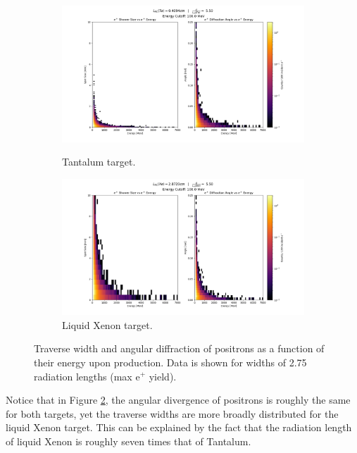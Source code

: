 \documentclass[%
reprint,
amsmath, amssymb,
aps,
floatfix,
]{revtex4-2}
\begin{document}
\begin{figure}[H]
    \begin{subfigure}{.5\textwidth}
        \includegraphics[height = .65\linewidth]{../images/TaHists.png}
        \caption{\label{fig:TaHists}Tantalum target.}
        \includegraphics[height = .65\linewidth]{../images/XeHists.png}
        \caption{\label{fig:XeHists}Liquid Xenon target.}
    \end{subfigure}
    \caption{\label{fig:Hists}Traverse width and angular diffraction of positrons as a function
    of their energy upon production.  Data is shown for widths of 2.75 radiation lengths (max e$^+$ yield).}
\end{figure}

Notice that in Figure \ref{fig:Hists}, the angular divergence of positrons is roughly the same for both targets,
yet the traverse widths are more broadly distributed for the liquid Xenon target.  This can be explained by the 
fact that the radiation length of liquid Xenon is roughly seven times that of Tantalum.
\end{document}

